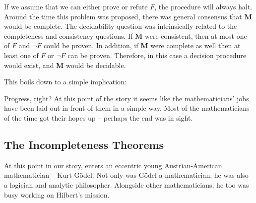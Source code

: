 \documentclass[a4paper, 12pt]{article}
\newcommand{\godel}{G\"{o}del }
\theoremstyle{definition}
\begin{document}
    If we assume that we can either prove or refute $F$, the procedure will always halt. Around the time this problem was proposed,
    there was general consensus that \textbf{M} would be complete. The decidability question was intrinsically related to the completeness 
    and consistency questions. If \textbf{M} were consistent, then at most one of $F$ and $\neg F$ could be proven. In addition, if \textbf{M} were complete as well 
    then at least one of $F$ or $\neg F$ can be proven. Therefore, in this case a decision procedure would exist, and \textbf{M} would be 
    decidable. \cite{zach_hilberts_2019}

    This boils down to a simple implication:
    \vspace{-0.5 em}
    \begin{figure}[h]
        \centering
        \vspace{-0.5 em} 
    \end{figure} 
    
    Progress, right? At this point of the story it seems like the mathematicians' jobs have been laid out in front of them 
    in a simple way. Most of the mathematicians of the time got their hopes up -- perhaps the end was in sight.
    
    \newpage
    \subsection*{The Incompleteness Theorems}
    
    At this point in our story, enters an eccentric young Austrian-American mathematician -- Kurt G\"{o}del. Not only was \godel a mathematician, he was 
    also a logician and analytic philosopher. Alongside other mathematicians, he too was busy working on 
    Hilbert's mission.
    
\end{document}
